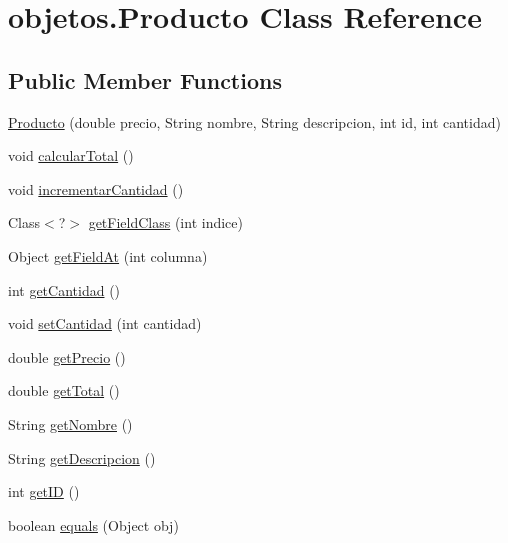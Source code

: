 \hypertarget{classobjetos_1_1_producto}{}\section{objetos.\+Producto Class Reference}
\label{classobjetos_1_1_producto}
\subsection*{Public Member Functions}
\begin{DoxyCompactItemize}
\item 
\mbox{\hyperlink{classobjetos_1_1_producto_a2944862f9387c43686583f85fdb9f79f}{Producto}} (double precio, String nombre, String descripcion, int id, int cantidad)
\item 
void \mbox{\hyperlink{classobjetos_1_1_producto_aca1868670a4e90738389af3bb5fa3e00}{calcular\+Total}} ()
\item 
void \mbox{\hyperlink{classobjetos_1_1_producto_afb28a08655f512fd3048a20281cbba44}{incrementar\+Cantidad}} ()
\item 
Class$<$?$>$ \mbox{\hyperlink{classobjetos_1_1_producto_a6f54f8859ba9713ddb89fd082e811bd8}{get\+Field\+Class}} (int indice)
\item 
Object \mbox{\hyperlink{classobjetos_1_1_producto_a5857c7b25c0113cf682c7ea25a667fab}{get\+Field\+At}} (int columna)
\item 
int \mbox{\hyperlink{classobjetos_1_1_producto_a33cadb40029d686345420c930bcabacf}{get\+Cantidad}} ()
\item 
void \mbox{\hyperlink{classobjetos_1_1_producto_ae14dcc26bdc312a512627177d4e7e442}{set\+Cantidad}} (int cantidad)
\item 
double \mbox{\hyperlink{classobjetos_1_1_producto_aa4b79134d6f59058f663c5e241bd6389}{get\+Precio}} ()
\item 
double \mbox{\hyperlink{classobjetos_1_1_producto_adbea45187ac465c2a7a2993f4739cb40}{get\+Total}} ()
\item 
String \mbox{\hyperlink{classobjetos_1_1_producto_a57f2351473e89e49d44441154f6110ed}{get\+Nombre}} ()
\item 
String \mbox{\hyperlink{classobjetos_1_1_producto_a47b9a05a0e7a504aaa56564c1b146927}{get\+Descripcion}} ()
\item 
int \mbox{\hyperlink{classobjetos_1_1_producto_a60da2dbd5b5666a42c88295cf72fc193}{get\+ID}} ()
\item 
boolean \mbox{\hyperlink{classobjetos_1_1_producto_a69f1b30e6711e637dbfd074c057adeee}{equals}} (Object obj)
\end{DoxyCompactItemize}


